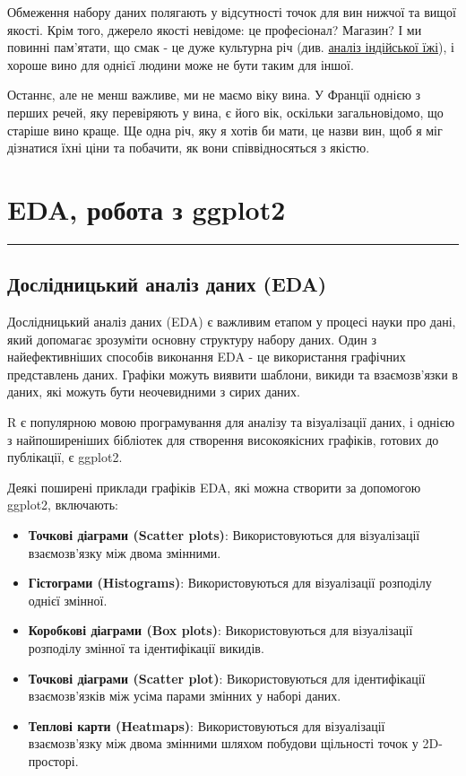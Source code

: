 \documentclass[
  letterpaper,
  DIV=11,
  numbers=noendperiod]{scrreprt}
\providecommand{\tightlist}{%
  \setlength{\itemsep}{0pt}\setlength{\parskip}{0pt}}\usepackage{longtable,booktabs,array}
\begin{document}
Обмеження набору даних полягають у відсутності точок для вин нижчої та
вищої якості. Крім того, джерело якості невідоме: це професіонал?
Магазин? І ми повинні пам'ятати, що смак - це дуже культурна річ (див.
\href{http://www.washingtonpost.com/blogs/wonkblog/wp/2015/03/03/\%20a-scientific-explanation-of-what-makes-indian-food-so-delicious/}{аналіз
індійської їжі}), і хороше вино для однієї людини може не бути таким для
іншої.

Останнє, але не менш важливе, ми не маємо віку вина. У Франції однією з
перших речей, яку перевіряють у вина, є його вік, оскільки
загальновідомо, що старіше вино краще. Ще одна річ, яку я хотів би мати,
це назви вин, щоб я міг дізнатися їхні ціни та побачити, як вони
співвідносяться з якістю.

\chapter{EDA, робота з
ggplot2}\label{eda-ux440ux43eux431ux43eux442ux430-ux437-ggplot2}

\begin{center}\rule{0.5\linewidth}{0.5pt}\end{center}

\section{Дослідницький аналіз даних
(EDA)}\label{ux434ux43eux441ux43bux456ux434ux43dux438ux446ux44cux43aux438ux439-ux430ux43dux430ux43bux456ux437-ux434ux430ux43dux438ux445-eda}

Дослідницький аналіз даних (EDA) є важливим етапом у процесі науки про
дані, який допомагає зрозуміти основну структуру набору даних. Один з
найефективніших способів виконання EDA - це використання графічних
представлень даних. Графіки можуть виявити шаблони, викиди та
взаємозв'язки в даних, які можуть бути неочевидними з сирих даних.

R є популярною мовою програмування для аналізу та візуалізації даних, і
однією з найпоширеніших бібліотек для створення високоякісних графіків,
готових до публікації, є ggplot2.

Деякі поширені приклади графіків EDA, які можна створити за допомогою
ggplot2, включають:

\begin{itemize}
\tightlist
\item
  \textbf{Точкові діаграми (Scatter plots)}: Використовуються для
  візуалізації взаємозв'язку між двома змінними.
\item
  \textbf{Гістограми (Histograms)}: Використовуються для візуалізації
  розподілу однієї змінної.
\item
  \textbf{Коробкові діаграми (Box plots)}: Використовуються для
  візуалізації розподілу змінної та ідентифікації викидів.
\item
  \textbf{Точкові діаграми (Scatter plot)}: Використовуються для
  ідентифікації взаємозв'язків між усіма парами змінних у наборі даних.
\item
  \textbf{Теплові карти (Heatmaps)}: Використовуються для візуалізації
  взаємозв'язку між двома змінними шляхом побудови щільності точок у
  2D-просторі.
\end{itemize}
\end{document}
